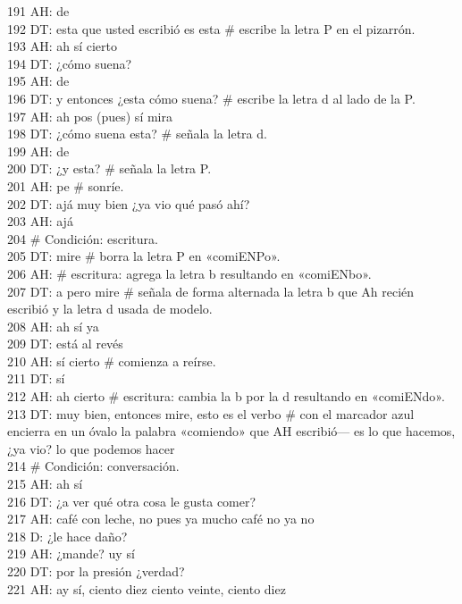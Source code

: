 191 AH: de\\
192 DT: esta que usted escribió es esta \# escribe la letra P en el pizarrón.\\
193 AH: ah sí cierto\\
194 DT: ¿cómo suena?\\
195 AH: de\\
196 DT: y entonces ¿esta cómo suena? \# escribe la letra d al lado de la P.\\
197 AH: ah pos (pues) sí mira\\
198 DT: ¿cómo suena esta? \# señala la letra d.\\
199 AH: de\\
200 DT: ¿y esta? \# señala la letra P.\\
201 AH: pe \# sonríe.\\
202 DT: ajá muy bien ¿ya vio qué pasó ahí?\\
203 AH: ajá\\
204 \# Condición: escritura.\\
205 DT: mire \# borra la letra P en «comiENPo».\\
206 AH: \# escritura: agrega la letra b resultando en «comiENbo».\\
207 DT: a pero mire \# señala de forma alternada la letra b que Ah recién escribió y la letra d usada de modelo.\\
208 AH: ah sí ya\\
209 DT: está al revés\\
210 AH: sí cierto \# comienza a reírse.\\
211 DT: sí\\
212 AH: ah cierto \# escritura: cambia la b por la d resultando en «comiENdo».\\
213 DT: muy bien, entonces mire, esto es el verbo \# con el marcador azul encierra en un óvalo la palabra «comiendo» que AH escribió--- es lo que hacemos, ¿ya vio? lo que podemos hacer\\
214 \# Condición: conversación.\\
215 AH: ah sí\\
216 DT: ¿a ver qué otra cosa le gusta comer?\\
217 AH: café con leche, no pues ya mucho café no ya no\\
218 D: ¿le hace daño?\\
219 AH: ¿mande? uy sí\\
220 DT: por la presión ¿verdad?\\
221 AH: ay sí, ciento diez ciento veinte, ciento diez\\

